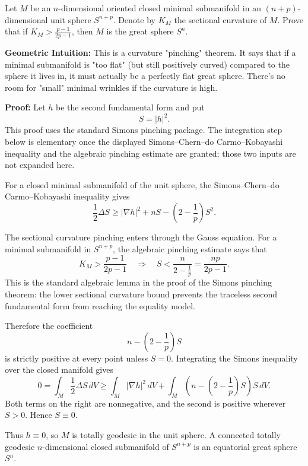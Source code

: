 \begin{exercise}
\label{geometry:2017:6}
Let $M$ be an $n$-dimensional oriented closed minimal submanifold in an $(n + p)$-dimensional unit sphere $S^{n+p}$. Denote by $K_{M}$ the sectional curvature of $M$. Prove that if $K_{M} > \frac{p-1}{2p-1}$, then $M$ is the great sphere $S^{n}$.
\end{exercise}

\begin{solution}
\textbf{Geometric Intuition:} This is a curvature "pinching" theorem. It says that if a minimal submanifold is "too flat" (but still positively curved) compared to the sphere it lives in, it must actually be a perfectly flat great sphere. There's no room for "small" minimal wrinkles if the curvature is high.

\textbf{Proof:}
Let $h$ be the second fundamental form and put
\[
S=|h|^2.
\]
This proof uses the standard Simons pinching package. The integration step below is elementary once the displayed Simons--Chern--do Carmo--Kobayashi inequality and the algebraic pinching estimate are granted; those two inputs are not expanded here.

For a closed minimal submanifold of the unit sphere, the Simons--Chern--do Carmo--Kobayashi inequality gives
\[
\frac{1}{2}\Delta S
\geq
|\nabla h|^2+nS-\left(2-\frac{1}{p}\right)S^2.
\]

The sectional curvature pinching enters through the Gauss equation. For a minimal submanifold in $S^{n+p}$, the algebraic pinching estimate says that
\[
K_M>\frac{p-1}{2p-1}
\quad\Longrightarrow\quad
S<\frac{n}{2-\frac{1}{p}}
=\frac{np}{2p-1}.
\]
This is the standard algebraic lemma in the proof of the Simons pinching theorem: the lower sectional curvature bound prevents the traceless second fundamental form from reaching the equality model.

Therefore the coefficient
\[
n-\left(2-\frac{1}{p}\right)S
\]
is strictly positive at every point unless $S=0$. Integrating the Simons inequality over the closed manifold gives
\[
0
=
\int_M \frac{1}{2}\Delta S\,dV
\geq
\int_M |\nabla h|^2\,dV
+
\int_M
\left(n-\left(2-\frac{1}{p}\right)S\right)S\,dV.
\]
Both terms on the right are nonnegative, and the second is positive wherever $S>0$. Hence $S\equiv 0$.

Thus $h\equiv 0$, so $M$ is totally geodesic in the unit sphere. A connected totally geodesic $n$-dimensional closed submanifold of $S^{n+p}$ is an equatorial great sphere $S^n$.
\end{solution}

